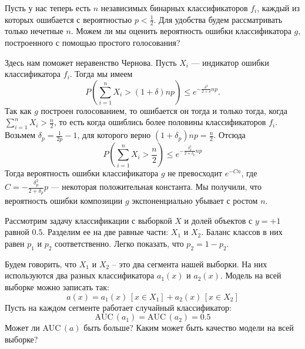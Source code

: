 \documentclass[12pt,fleqn]{article}
\begin{document}
    \begin{vkProblem}
        Пусть у нас теперь есть $n$ независимых бинарных классификаторов $f_i$, каждый из которых ошибается с вероятностью $p < \frac{1}{2}$. Для удобства будем рассматривать только нечетные $n$. Можем ли мы оценить вероятность ошибки классификатора $g$, построенного с помощью простого голосования?
    \end{vkProblem}    
    \begin{esSolution}
        Здесь нам поможет неравенство Чернова. Пусть $X_i$ — индикатор ошибки классификатора $f_i$. Тогда мы имеем
        $$
        P(\sum_{i = 1}^n X_i > (1 + \delta)np) \le e^{-\frac{\delta^2}{2 + \delta}np}.
        $$
        Так как $g$ построен голосованием, то ошибается он тогда и только тогда, когда $\sum_{i = 1}^n X_i > \frac{n}{2}$, то есть когда ошиблись более половины классификаторов $f_i$. Возьмем $\delta_p = \frac{1}{2p} - 1$, для которого верно $(1 + \delta_p)np = 
        \frac{n}{2}$. Отсюда 
        $$
        P(\sum_{i = 1}^n X_i > \frac{n}{2}) \le e^{-\frac{\delta_p^2}{2 + \delta_p}np}
        $$
        Тогда вероятность ошибки классификатора $g$ не превосходит $e^{-Cn}$, где $C = -\frac{\delta_p^2}{2 + \delta_p}p$ — некоторая положительная константа. Мы получили, что вероятность ошибки композиции $g$ экспоненциально убывает с ростом $n$.
    \end{esSolution}


    \begin{vkProblem}
        Рассмотрим задачу классификации с выборкой $X$ и долей объектов с $ y = + 1 $ равной $ 0.5 $.
        Разделим ее на две равные части: $ X_1 $ и $ X_2 $.
        Баланс классов в них равен $ p_1 $ и $ p_2 $ соответственно.
        Легко показать, что $ p_2 = 1 - p_2 $.
        
        Будем говорить, что $ X_1 $ и $ X_2 $ – это два сегмента нашей выборки.
        На них используются два разных классификатора $ a_1(x) $ и $ a_2(x) $.
        Модель на всей выборке можно записать так:
        $$
            a(x) = a_1(x)\,\left[x \in X_1\right] + a_2(x)\,\left[x \in X_2\right]
        $$
        Пусть на каждом сегменте работает случайный классификатор:
        $$
            \text{AUC}\,(a_1) = \text{AUC}\,(a_2) = 0.5
        $$
        Может ли $ \text{AUC}\,(a) $ быть больше?
        Каким может быть качество модели на всей выборке?
    \end{vkProblem}
    
\end{document}
